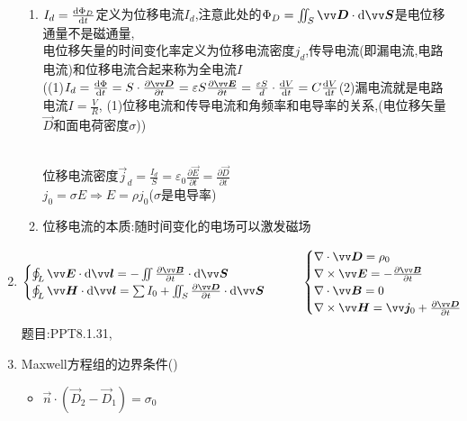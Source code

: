 \documentclass{article}
\begin{document}
\begin{enumerate}[label=(\arabic*)]
\begin{enumerate}[label=(\roman*)]
          \item $I_d = \frac{\mathop{}\!\mathrm{d} \Phi _D}{\mathop{}\!\mathrm{d} t}$定义为{\red 位移电流$I_d$,注意此处的$\Phi_D = \iint_S \vec{D}\cdot \dif \vec{S}$是{\blue 电位移通量}不是{\blue 磁通量}},\\
                {\blue 电位移矢量的时间变化率}定义为{\red 位移电流密度$j_d$},传导电流(即漏电流,电路电流)和位移电流合起来称为{\red 全电流$I$}\\
                ({(1)$I_d = \frac{\dif \Phi}{\dif t} = S\cdot \frac{\partial \vec{D}}{\partial t} = \varepsilon S \frac{\partial \vec{E}}{\partial t} = \frac{\varepsilon S}{d}\cdot \frac{\dif V}{\dif t} = C \frac{\dif V}{\dif t}$(2)漏电流就是电路电流$I = \frac{V}{R}$,
                (1)位移电流和传导电流和角频率和电导率的关系,(电位移矢量$\vec{D}$和面电荷密度$\sigma$)})
                \begin{corollary}
                  \mbox{}\\
                  位移电流密度$\vec{j}_d = \frac{I_d}{S} = \varepsilon_0 \frac{\partial \vec{E}}{\partial t} = \frac{\partial \vec{D}}{\partial t}$\\
                  $j_0=\sigma E\Rightarrow E=\rho j_0$($\sigma$是电导率)
                \end{corollary}
          \item 位移电流的本质:随时间变化的电场可以激发磁场
        \end{enumerate}
  \item \[\begin{cases}
          \oint_L \vec{E}\cdot \dif \vec{l} = -\iint \frac{\partial \vec{B}}{\partial t}\cdot \dif \vec{S}\\
          \oint_L \vec{H}\cdot \dif \vec{l} = \sum I_0 + \iint_S \frac{\partial \vec{D}}{\partial t}\cdot \dif \vec{S}
        \end{cases}\qquad
        \begin{cases}
          \nabla \cdot \vec{D} = \rho_0\\
          \nabla \times \vec{E} = -\frac{\partial \vec{B}}{\partial t}\\
          \nabla\cdot \vec{B} = 0\\
          \nabla\times \vec{H} = \vec{j}_0 + \frac{\partial \vec{D}}{\partial t}
        \end{cases}
        \]
        题目:PPT8.1.31,
  \item Maxwell方程组的边界条件({})
        \begin{itemize}
          \item $\vec{n}\cdot (\vec{D}_2-\vec{D}_1)=\sigma_0$

\end{itemize}
\end{enumerate}
\end{document}
